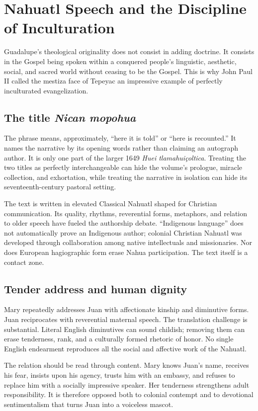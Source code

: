 \section{Nahuatl Speech and the Discipline of Inculturation}

Guadalupe's theological originality does not consist in adding doctrine. It consists in the Gospel being spoken within a conquered people's linguistic, aesthetic, social, and sacred world without ceasing to be the Gospel. This is why John Paul II called the mestiza face of Tepeyac an impressive example of perfectly inculturated evangelization.

\subsection{The title \emph{Nican mopohua}}

The phrase means, approximately, “here it is told” or “here is recounted.” It names the narrative by its opening words rather than claiming an autograph author. It is only one part of the larger 1649 \emph{Huei tlamahuiçoltica}. Treating the two titles as perfectly interchangeable can hide the volume's prologue, miracle collection, and exhortation, while treating the narrative in isolation can hide its seventeenth-century pastoral setting.

The text is written in elevated Classical Nahuatl shaped for Christian communication. Its quality, rhythms, reverential forms, metaphors, and relation to older speech have fueled the authorship debate. “Indigenous language” does not automatically prove an Indigenous author; colonial Christian Nahuatl was developed through collaboration among native intellectuals and missionaries. Nor does European hagiographic form erase Nahua participation. The text itself is a contact zone.

\subsection{Tender address and human dignity}

Mary repeatedly addresses Juan with affectionate kinship and diminutive forms. Juan reciprocates with reverential maternal speech. The translation challenge is substantial. Literal English diminutives can sound childish; removing them can erase tenderness, rank, and a culturally formed rhetoric of honor. No single English endearment reproduces all the social and affective work of the Nahuatl.

The relation should be read through content. Mary knows Juan's name, receives his fear, insists upon his agency, trusts him with an embassy, and refuses to replace him with a socially impressive speaker. Her tenderness strengthens adult responsibility. It is therefore opposed both to colonial contempt and to devotional sentimentalism that turns Juan into a voiceless mascot.

